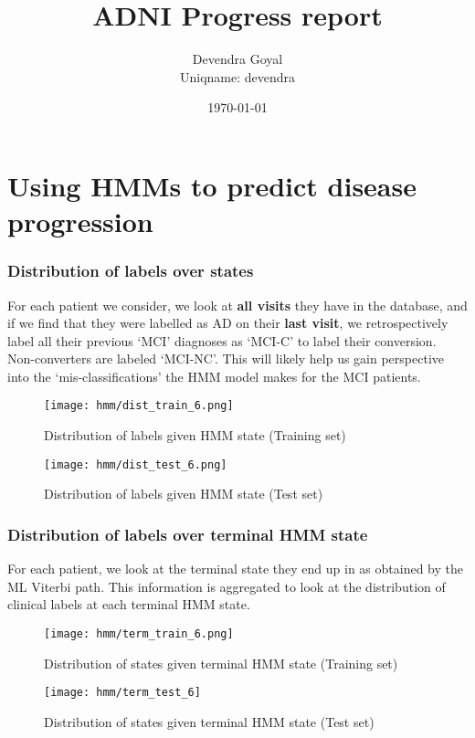 \documentclass[12pt,a4paper]{article}
\title{ADNI Progress report}
\author{Devendra Goyal\\Uniqname: devendra}
\date{\today}
\begin{document}
\maketitle

\part{Using HMMs to predict disease progression}

\section{Distribution of labels over states}
\label{sec:dist-lab-stat}

For each patient we consider, we look at \textbf{all visits} they have
in the database, and if we find that they were labelled as AD on their
\textbf{last visit}, we retrospectively label all their previous `MCI'
diagnoses as `MCI-C' to label their conversion. Non-converters are
labeled `MCI-NC'. This will likely help us gain perspective into the
`mis-classifications' the HMM model makes for the MCI patients.

\begin{figure}[H]
  \centering
  \texttt{[image: hmm/dist\_train\_6.png]}
  \caption{Distribution of labels given HMM state (Training set)}  
\end{figure}

\begin{figure}[H]
  \centering
  \texttt{[image: hmm/dist\_test\_6.png]}
  \caption{Distribution of labels given HMM state (Test set)}  
\end{figure}

\section{Distribution of labels over terminal HMM state}
\label{sec:dist-term-stat}

For each patient, we look at the terminal state they end up in as
obtained by the ML Viterbi path. This information is aggregated to
look at the distribution of clinical labels at each terminal HMM state.

\begin{figure}[H]
  \centering
  \texttt{[image: hmm/term\_train\_6.png]}
  \caption{Distribution of states given terminal HMM state (Training set)}  
\end{figure}

\begin{figure}[H]
  \centering
  \texttt{[image: hmm/term\_test\_6]}
  \caption{Distribution of states given terminal HMM state (Test set)}  
\end{figure}
\end{document}
